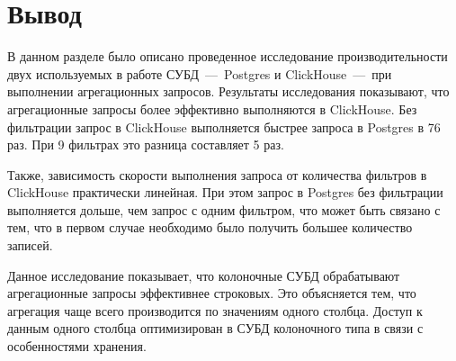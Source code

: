\section{Вывод}
В данном разделе было описано проведенное исследование производительности двух используемых в работе СУБД~---~Postgres и ClickHouse~---~при выполнении агрегационных запросов. Результаты исследования показывают, что агрегационные запросы более эффективно выполняются в ClickHouse. Без фильтрации запрос в ClickHouse выполняется быстрее запроса в Postgres в 76 раз. При 9 фильтрах это разница составляет 5 раз.

Также, зависимость скорости выполнения запроса от количества фильтров в ClickHouse практически линейная. При этом запрос в Postgres без фильтрации выполняется дольше, чем запрос с одним фильтром, что может быть связано с тем, что в первом случае необходимо было получить большее количество записей. 

Данное исследование показывает, что колоночные СУБД обрабатывают агрегационные запросы эффективнее строковых. Это объясняется тем, что агрегация чаще всего производится по значениям одного столбца. Доступ к данным одного столбца оптимизирован в СУБД колоночного типа в связи с особенностями хранения.
